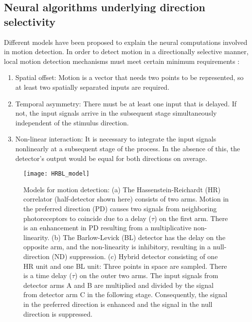 \subsection{Neural algorithms underlying direction selectivity}
Different models have been proposed to explain the neural computations involved in motion detection. In order to detect motion in a directionally selective manner, local motion detection mechanisms must meet certain minimum requirements \parencite{Borst1989}:
\begin{enumerate}
\item Spatial offset: Motion is a vector that needs two points to be represented, so at least two spatially separated inputs are required.
\item Temporal asymmetry: There must be at least one input that is delayed. If not, the input signals arrive in the subsequent stage simultaneously independent of the stimulus direction.
\item Non-linear interaction: It is necessary to integrate the input signals nonlinearly at a subsequent stage of the process. In the absence of this, the detector's output would be equal for both directions on average.
\end{enumerate} 

\begin{figure}
\centering
\hspace*{-1cm} 
\texttt{[image: HRBL\_model]}
\caption[Models for motion detection] {Models for motion detection: (a) The Hassenstein-Reichardt (HR) correlator (half-detector shown here) consists of two arms. Motion in the preferred direction (PD) causes two signals from neighboring photoreceptors to coincide due to a delay ($\tau$) on the first arm. There is an enhancement in PD resulting from a multiplicative non-linearity. (b) The Barlow-Levick (BL) detector has the delay on the opposite arm, and the non-linearity is inhibitory, resulting in a null-direction (ND) suppression. (c) Hybrid detector consisting of one HR unit and one BL unit: Three points in space are sampled. There is a time delay ($\tau$) on the outer two arms. The input signals from detector arms A and B are multiplied and divided by the signal from detector arm C in the following stage. Consequently, the signal in the preferred direction is enhanced and the signal in the null direction is suppressed.}
\label{fig:hrblmodel}
\end{figure}

